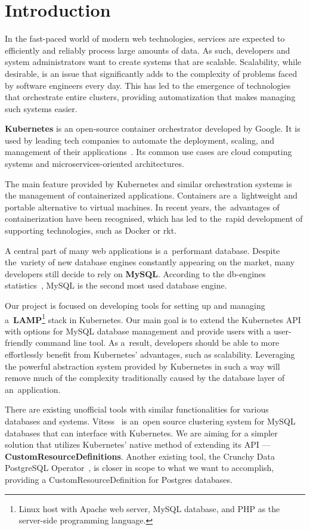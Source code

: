 \chapter{Introduction}
In the fast-paced world of modern web technologies, services are expected to
efficiently and reliably process large amounts of data. As such, developers
and system administrators want to create systems that are scalable. Scalability,
while desirable, is an issue that significantly adds to the complexity of
problems faced by software engineers every day. This has led to the emergence of
technologies that orchestrate entire clusters, providing automatization that
makes managing such systems easier.

\textbf{Kubernetes} is an open-source container orchestrator developed by
Google. It is used by leading tech companies to automate the deployment,
scaling, and management of their applications~\cite{kube-usecase}. Its common
use cases are cloud computing systems and microservices-oriented architectures.

The main feature provided by Kubernetes and similar orchestration
systems is the management of containerized applications. Containers are
a~lightweight and portable alternative to virtual machines. In recent years,
the~advantages of containerization have been recognised, which has led to
the~rapid development of supporting technologies, such as Docker or rkt.

A central part of many web applications is a~performant database. Despite
the~variety of new database engines constantly appearing on the market, many
developers still decide to rely on \textbf{MySQL}. According to the db-engines
statistics~\cite{db-eng}, MySQL is the second most used database
engine.

Our project is focused on developing tools for setting up and managing
a~\textbf{LAMP}\footnote{Linux host with Apache web server, MySQL database,
and PHP as the server-side programming language.} stack in Kubernetes. Our main goal is to
extend the Kubernetes API with options for MySQL database
management and provide users with a user-friendly command line tool. As
a~result, developers should be able to more effortlessly benefit from
Kubernetes’ advantages, such as scalability. Leveraging the powerful
abstraction system provided by Kubernetes in such a way will remove
much of the complexity traditionally caused by the database layer of
an~application.

There are existing unofficial tools with similar functionalities for various
databases and systems. Vitess~\cite{vitess} is an~open source
clustering system for MySQL databases that can interface with
Kubernetes. We are aiming for a simpler solution that utilizes
Kubernetes' native method of extending its API ---
\textbf{CustomResourceDefinitions}. Another existing tool,
the Crunchy Data PostgreSQL Operator~\cite{psql-op}, is closer in scope to what we want to
accomplish, providing a CustomResourceDefinition for Postgres databases.

